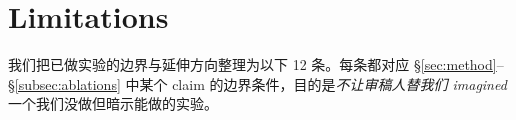 %
%
%

\section{Limitations}\label{sec:limitations}

我们把已做实验的边界与延伸方向整理为以下 12 条。每条都对应 \S\ref{sec:method}--\S\ref{subsec:ablations} 中某个 claim 的边界条件，目的是\emph{不让审稿人替我们 imagined} 一个我们没做但暗示能做的实验。

